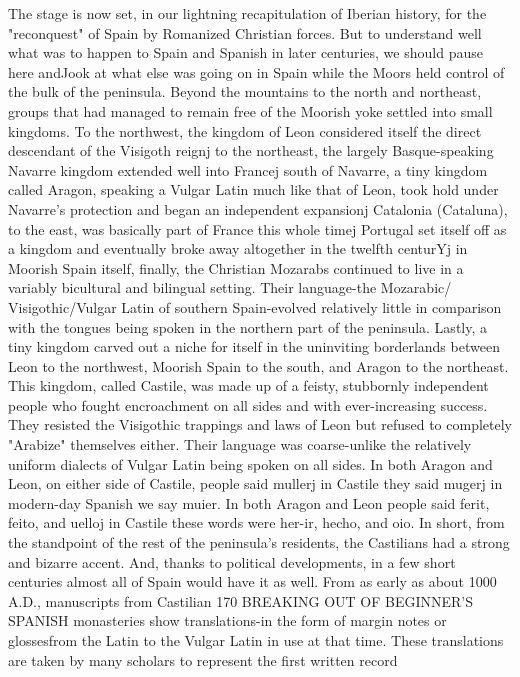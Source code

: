 \documentclass[14pt,a4paper,oneside]{memoir}
\begin{document}
{{{{%
The stage is now set, in our lightning recapitulation of Iberian
history, for the "reconquest" of Spain by Romanized Christian forces.
But to understand well what was to happen to Spain and Spanish in
later centuries, we should pause here andJook at what else was going
on in Spain while the Moors held control of the bulk of the peninsula.
Beyond the mountains to the north and northeast, groups that
had managed to remain free of the Moorish yoke settled into small
kingdoms. To the northwest, the kingdom of Leon considered itself the
direct descendant of the Visigoth reignj to the northeast, the largely
Basque-speaking Navarre kingdom extended well into Francej south of
Navarre, a tiny kingdom called Aragon, speaking a Vulgar Latin much
like that of Leon, took hold under Navarre's protection and began an
independent expansionj Catalonia (Cataluna), to the east, was basically
part of France this whole timej Portugal set itself off as a kingdom and
eventually broke away altogether in the twelfth centurYj in Moorish
Spain itself, finally, the Christian Mozarabs continued to live in a variably bicultural and bilingual setting. Their language-the Mozarabic/
Visigothic/Vulgar Latin of southern Spain-evolved relatively little in
comparison with the tongues being spoken in the northern part of the
peninsula.
Lastly, a tiny kingdom carved out a niche for itself in the uninviting borderlands between Leon to the northwest, Moorish Spain to
the south, and Aragon to the northeast. This kingdom, called Castile,
was made up of a feisty, stubbornly independent people who fought
encroachment on all sides and with ever-increasing success. They resisted the Visigothic trappings and laws of Leon but refused to completely "Arabize" themselves either. Their language was coarse-unlike the relatively uniform dialects of Vulgar Latin being spoken on all
sides. In both Aragon and Leon, on either side of Castile, people said
mullerj in Castile they said mugerj in modern-day Spanish we say
muier. In both Aragon and Leon people said ferit, feito, and uelloj in
Castile these words were her-ir, hecho, and oio. In short, from the
standpoint of the rest of the peninsula's residents, the Castilians had
a strong and bizarre accent. And, thanks to political developments, in
a few short centuries almost all of Spain would have it as well.
From as early as about 1000 A.D., manuscripts from Castilian
170 BREAKING OUT OF BEGINNER'S SPANISH
monasteries show translations-in the form of margin notes or glossesfrom the Latin to the Vulgar Latin in use at that time. These translations are taken by many scholars to represent the first written record
}}}}
\end{document}
